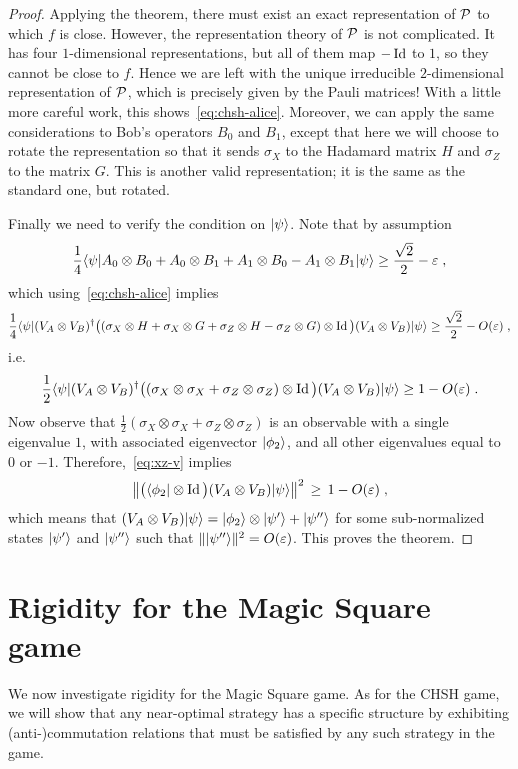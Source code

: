 \begin{proof}
Applying the theorem, there must exist an exact representation of $\mathcal{P}$ to which $f$ is close. However, the representation theory of $\mathcal{P}$ is not complicated. It has four $1$-dimensional representations, but all of them map $-\mathop{\rm Id}\nolimits$ to $1$, so they cannot be close to $f$. Hence we are left with the unique irreducible $2$-dimensional representation of $\mathcal{P}$, which is precisely given by the Pauli matrices! With a little more careful work, this shows~\eqref{eq:chsh-alice}. Moreover, we can apply the  same considerations to Bob's operators $B_0$ and $B_1$, except that here we will choose to rotate the representation so that it sends $\sigma_X$ to the Hadamard matrix $H$ and $\sigma_Z$ to the matrix $G$. This is another valid representation; it is the same as the standard one, but rotated. 

Finally we need to verify the condition on $|\psi\rangle$. Note that by assumption 
$$ \frac{1}{4}\langle\psi| A_0 \otimes B_0 + A_0 \otimes B_1 + A_1 \otimes B_0 - A_1\otimes B_1 |\psi\rangle \geq \frac{\sqrt{2}}{2} - \varepsilon\;,$$
which using~\eqref{eq:chsh-alice} implies 
$$ \frac{1}{4} \langle\psi|(V_A\otimes V_B)^\dagger \big( (\sigma_X \otimes H + \sigma_X \otimes G + \sigma_Z \otimes H - \sigma_Z\otimes G)\otimes\mathop{\rm Id}\nolimits\big) (V_A\otimes V_B)|\psi\rangle \geq \frac{\sqrt{2}}{2} - O({\varepsilon})\;,$$
i.e. 
\begin{equation}\label{eq:xz-v}
\frac{1}{2}\langle\psi|(V_A\otimes V_B)^\dagger \big( (\sigma_X \otimes \sigma_X + \sigma_Z \otimes \sigma_Z )\otimes \mathop{\rm Id}\nolimits\big)(V_A\otimes V_B)|\psi\rangle \geq 1 - O({\varepsilon})\;.
\end{equation}
Now observe that $\frac{1}{2}(\sigma_X \otimes \sigma_X + \sigma_Z \otimes \sigma_Z )$ is an observable with a single eigenvalue $1$, with associated eigenvector $|\phi_2\rangle$, and all other eigenvalues equal to $0$ or $-1$. Therefore,~\eqref{eq:xz-v} implies 
\[ \big\|\big(\langle\phi_2|\otimes \mathop{\rm Id}\nolimits\big)(V_A\otimes V_B)|\psi\rangle\big\|^2 \,\geq\, 1-O({\varepsilon})\;,\]
which means that $(V_A\otimes V_B)|\psi\rangle = |\phi_2\rangle \otimes |\psi'\rangle + |\psi''\rangle$ for some sub-normalized states $|\psi'\rangle$ and $|\psi''\rangle$ such that $\||\psi''\rangle\|^2 = O(\varepsilon)$. This proves the theorem. 
\end{proof}

\section{Rigidity for the Magic Square game}

We now investigate rigidity for the Magic Square game. As for the CHSH game, we will show that any near-optimal strategy has a specific structure by exhibiting (anti-)commutation relations that must be satisfied by any such strategy in the game.

